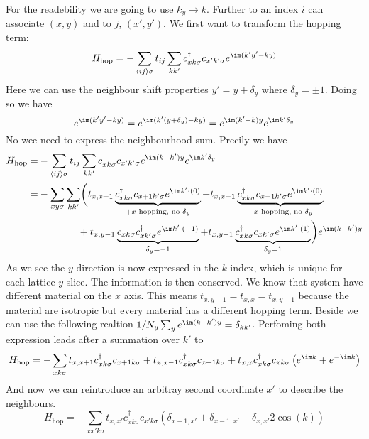 \documentclass[../main.tex]{subfile}
\begin{document}
For the readebility we are going to use $k_y \rightarrow k$.
Further to an index $i$  can associate $(x,y)$ and to $j$, $(x',y')$.
We first want to transform the hopping term:
\begin{equation*}
    H_{\text{hop}} = -\sum_{\langle ij\rangle \sigma} t_{ij} \sum_{kk'} c^{\dagger}_{x k\sigma} c_{x' k'\sigma} e^{\im (k' y' - k y)}
\end{equation*}
Here we can use the neighbour shift properties $y' = y + \delta_y$ where $\delta_y = \pm 1$. Doing so we have 
\[
    e^{\im (k' y' - k y)} = e^{\im (k' (y+\delta_y) -  k y)} = e^{\im (k' -  k)y}e^{\im k'\delta_y}
\]
No wee need to express the neighbourhood sum. Precily we have
\begin{align*}
        H_{\text{hop}} =& -\sum_{\langle ij\rangle \sigma} t_{ij} \sum_{kk'} c^{\dagger}_{x k\sigma} c_{x' k'\sigma}  e^{\im (k -  k')y}e^{\im k'\delta_y}\\
                        =& -\sum_{xy \sigma} \sum_{kk'}  \biggl( t_{x,x+1} \underbrace{c_{x k\sigma}^{\dagger} c_{x+1 k'\sigma}e^{\im k'\cdot (0)}}_{\text{$+x$ hopping, no $\delta_y$}} +  t_{x,x-1} \underbrace{c_{x k\sigma}^{\dagger} c_{x-1 k'\sigma} e^{\im k'\cdot (0)}}_{\text{$-x$ hopping, no $\delta_y$}}\\
                        & ~~~~~~~~~~~~+t_{x,y-1} \underbrace{c_{x k\sigma} c_{x k'\sigma}^{\dagger} e^{\im k'\cdot (-1)}}_{\delta_y = -1} + t_{x,y+1} \underbrace{c_{x k\sigma}^{\dagger} c_{x k'\sigma}e^{\im k'\cdot (1)}}_{\delta_y = 1}\biggr)e^{\im (k -  k')y}
\end{align*}
As we see the $y$ direction is now expressed in the $k$-index, which is unique for each lattice $y$-slice. The information is then conserved. 
We know that system have different material on the $x$ axis. This means $t_{x,y-1} = t_{x,x} = t_{x,y+1}$ because the material are isotropic but every material has a 
different hopping term. Beside we can use the following realtion $1/N_y \sum_{y} e^{\im (k -  k')y} = \delta_{kk'}$. Perfoming both expression leads after a summation over $k'$ to
\begin{equation*}
    H_{\text{hop}} = -\sum_{x k \sigma} t_{x,x+1} c_{x k\sigma}^{\dagger} c_{x+1 k\sigma} + t_{x,x-1} c_{x k\sigma}^{\dagger} c_{x+1 k\sigma} +  t_{x,x} c_{x k\sigma}^{\dagger} c_{xk\sigma}\left(e^{\im k} + e^{-\im k}\right)
\end{equation*}
And now we can reintroduce an arbitray second coordinate $x'$ to describe the neighbours.
\begin{equation}
    H_{\text{hop}} = -\sum_{xx' k \sigma} t_{x,x'} c_{x k\sigma}^{\dagger} c_{x' k\sigma} \left(\delta_{x+1,x'} + \delta_{x-1,x'} + \delta_{x,x'} 2 \cos(k)\right)
\end{equation}
\end{document}
